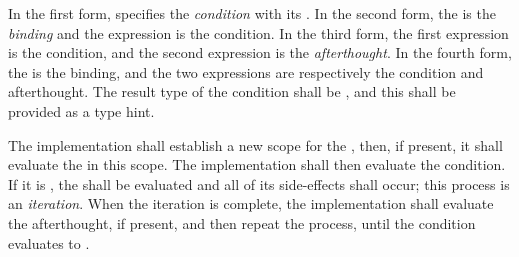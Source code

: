 \specsubsubitem
In the first form,  specifies the \textit{condition}
with its . In the second form, the
 is the \textit{binding} and the expression is the
condition. In the third form, the first expression is the condition, and the
second expression is the \textit{afterthought}. In the fourth form, the
 is the binding, and the two expressions are
respectively the condition and afterthought. The result type of the condition
shall be , and this shall be provided as a type hint.

\specsubsubitem
The implementation shall establish a new scope for the
, then, if present, it shall evaluate the
 in this scope. The implementation shall then evaluate the
condition. If it is , the  shall be
evaluated and all of its side-effects shall occur; this process is an
\textit{iteration}. When the iteration is complete, the implementation shall
evaluate the afterthought, if present, and then repeat the process, until the
condition evaluates to .


\begin{grammar}
 \\
	 \terminal{(}  \terminal{)} \terminal{\{}  \terminal{\}} \\

 \\
	 \terminal{;} \\
	 \terminal{;}  \\

 \\
	  \terminal{=>}  \\
	 \terminal{=>}  \\

 \\
	 \optional{\terminal{,}} \\
	 \terminal{,}  \\
\end{grammar}

